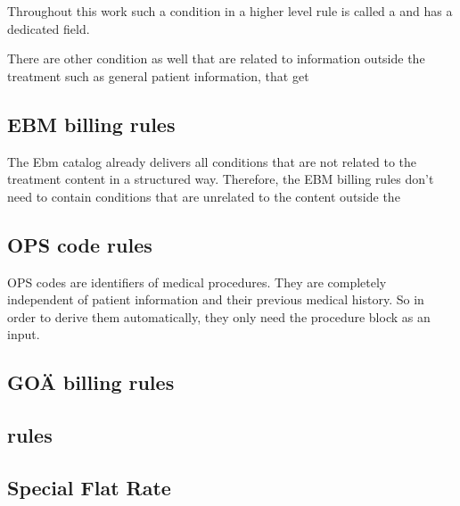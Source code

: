 Throughout this work such a condition in a higher level rule is called a  and has a dedicated field.


There are other condition as well that are related to information outside the treatment such as general patient information, that get


\subsection{EBM billing rules}
The Ebm catalog already delivers all conditions that are not related to the treatment content in a structured way.
Therefore, the EBM billing rules don't need to contain conditions that are unrelated to the content outside the

\subsection{OPS code rules}
OPS codes are identifiers of medical procedures.
They are completely independent of patient information and their previous medical history.
So in order to derive them automatically, they only need the procedure block as an input.

\subsection{GOÄ billing rules}





\subsection{\MJ rules}




\subsection{Special Flat Rate}


